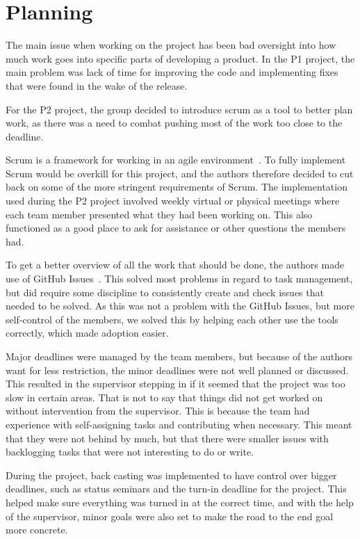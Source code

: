 \section{Planning}\label{sec:planning}

The main issue when working on the project has been bad oversight
into how much work goes into specific parts of developing a product.
In the P1 project, the main problem was lack of time for improving the code
and implementing fixes that were found in the wake of the release.

For the P2 project, the group decided to introduce scrum as a tool to
better plan work, as there was a need to combat pushing most of the
work too close to the deadline.

Scrum is a framework for working in an agile environment~\cite{agile-manifesto}.
To fully implement Scrum would be overkill for this project, and the authors
therefore decided to cut back on some of the more stringent requirements of Scrum.
The implementation used during the P2 project involved weekly virtual or physical meetings where each team member
presented what they had been working on.
This also functioned as a good place to ask for assistance or other questions the members had.

To get a better overview of all the work that should be done, the authors made use of GitHub
Issues~\cite{github-issues}.
This solved most problems in regard to task management, but did require some discipline to consistently create and check
issues that needed to be solved.
As this was not a problem with the GitHub Issues, but more self-control of the members, we solved this by helping each
other use the tools correctly, which made adoption easier.

Major deadlines were managed by the team members, but because of the authors want for less restriction, the minor
deadlines were not well planned or discussed.
This resulted in the supervisor stepping in if it seemed that the project was too slow in certain areas.
That is not to say that things did not get worked on without intervention from the supervisor.
This is because the team had experience with self-assigning tasks and contributing when necessary.
This meant that they were not behind by much, but that there were smaller issues with backlogging tasks that were not
interesting to do or write.

During the project, back casting was implemented to have control over bigger deadlines, such as status seminars and the
turn-in deadline for the project.
This helped make sure everything was turned in at the correct time, and with the help of the supervisor, minor goals
were also set to make the road to the end goal more concrete.
